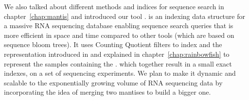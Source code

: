 We also talked about different methods and indices for sequence search
in chapter~\ref{chap:mantis} and introduced our tool \mantis.
\mantis is an indexing data structure for a massive RNA sequencing database enabling sequence
search queries that is more efficient in space and time compared to other tools
(which are based on sequence bloom trees). It uses Counting Quotient filters
to index \kmers and the representation introduced in \rainbowfish
and explained in chapter~\ref{chap:rainbowfish} to represent the samples containing the \kmer.
which together result in a small exact indexes, on a set of sequencing experiments.
We plan to make it dynamic and scalable to the exponentially
growing volume of RNA sequencing data by incorporating the idea of merging two mantises to build a bigger one.


